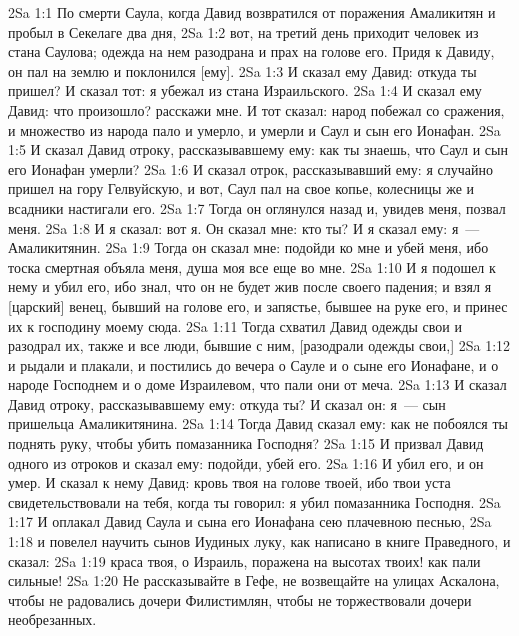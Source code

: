 \vs 2Sa 1:1 По смерти Саула, когда Давид возвратился от поражения Амаликитян и пробыл в Секелаге два дня,
\vs 2Sa 1:2 вот, на третий день приходит человек из стана Саулова; одежда на нем разодрана и прах на голове его. Придя к Давиду, он пал на землю и поклонился [ему].
\vs 2Sa 1:3 И сказал ему Давид: откуда ты пришел? И сказал тот: я убежал из стана Израильского.
\vs 2Sa 1:4 И сказал ему Давид: что произошло? расскажи мне. И тот сказал: народ побежал со сражения, и множество из народа пало и умерло, и умерли и Саул и сын его Ионафан.
\vs 2Sa 1:5 И сказал Давид отроку, рассказывавшему ему: как ты знаешь, что Саул и сын его Ионафан умерли?
\vs 2Sa 1:6 И сказал отрок, рассказывавший ему: я случайно пришел на гору Гелвуйскую, и вот, Саул пал на свое копье, колесницы же и всадники настигали его.
\vs 2Sa 1:7 Тогда он оглянулся назад и, увидев меня, позвал меня.
\vs 2Sa 1:8 И я сказал: вот я. Он сказал мне: кто ты? И я сказал ему: я~--- Амаликитянин.
\vs 2Sa 1:9 Тогда он сказал мне: подойди ко мне и убей меня, ибо тоска смертная объяла меня, душа моя все еще во мне.
\vs 2Sa 1:10 И я подошел к нему и убил его, ибо знал, что он не будет жив после своего падения; и взял я [царский] венец, бывший на голове его, и запястье, бывшее на руке его, и принес их к господину моему сюда.
\vs 2Sa 1:11 Тогда схватил Давид одежды свои и разодрал их, также и все люди, бывшие с ним, [разодрали одежды свои,]
\vs 2Sa 1:12 и рыдали и плакали, и постились до вечера о Сауле и о сыне его Ионафане, и о народе Господнем и о доме Израилевом, что пали они от меча.
\vs 2Sa 1:13 И сказал Давид отроку, рассказывавшему ему: откуда ты? И сказал он: я~--- сын пришельца Амаликитянина.
\vs 2Sa 1:14 Тогда Давид сказал ему: как не побоялся ты поднять руку, чтобы убить помазанника Господня?
\vs 2Sa 1:15 И призвал Давид одного из отроков и сказал ему: подойди, убей его.
\vs 2Sa 1:16 И  убил его, и он умер. И сказал к нему Давид: кровь твоя на голове твоей, ибо твои уста свидетельствовали на тебя, когда ты говорил: я убил помазанника Господня.
\rsbpar\vs 2Sa 1:17 И оплакал Давид Саула и сына его Ионафана сею плачевною песнью,
\vs 2Sa 1:18 и повелел научить сынов Иудиных луку, как написано в книге Праведного, и сказал:
\vs 2Sa 1:19 краса твоя, о Израиль, поражена на высотах твоих! как пали сильные!
\vs 2Sa 1:20 Не рассказывайте в Гефе, не возвещайте на улицах Аскалона, чтобы не радовались дочери Филистимлян, чтобы не торжествовали дочери необрезанных.
